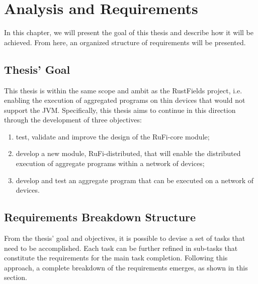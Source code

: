 
\chapter{Analysis and Requirements}
\label{chap:requirements}
In this chapter, we will present the goal of this thesis and describe how it will be achieved. From here, an organized structure of requirements will be presented.

\section{Thesis' Goal}
\label{sec:goal}
This thesis is within the same scope and ambit as the RustFields project, i.e. enabling the execution of aggregated programs on thin devices that would not support the JVM.
Specifically, this thesis aims to continue in this direction through the development of three objectives:

\begin{enumerate}
    \item \label{obj:1} test, validate and improve the design of the RuFi-core module;
    \item \label{obj:2} develop a new module, RuFi-distributed, that will enable the distributed execution of aggregate programs within a network of devices;
    \item \label{obj:3} develop and test an aggregate program that can be executed on a network of devices.
\end{enumerate}

\section{Requirements Breakdown Structure}
\label{sec:rbs}
From the thesis' goal and objectives, it is possible to devise a set of tasks that need to be accomplished. Each task can be further refined in sub-tasks that constitute the requirements for the main task completion.
Following this approach, a complete breakdown of the requirements emerges, as shown in this section.

